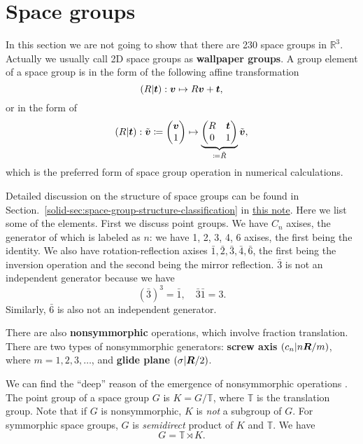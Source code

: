 \documentclass[hyperref, a4paper]{article}
\newcommand*{\concept}[1]{{\textbf{#1}}}
\newcommand{\soliddoc}{\href{../solid/solid.pdf}{this note}}
\begin{document}
\section{Space groups}

In this section we are not going to show that there are 230 space groups in $\mathbb{R}^3$. 
Actually we usually call 2D space groups as \concept{wallpaper groups}. A group element of a space group 
is in the form of the following affine transformation
\begin{equation}
    (R| \vb*{t}): \vb*{v} \mapsto R \vb*{v} + \vb*{t},
\end{equation}
or in the form of 
\begin{equation}
    (R | \vb*{t}) : \tilde{\vb*{v}} \coloneqq \pmqty{\vb*{v} \\ 1} \mapsto \underbrace{\pmqty{R & \vb*{t} \\ 0 & 1 }}_{\coloneqq \tilde{R}} \tilde{\vb*{v}},
\end{equation}
which is the preferred form of space group operation in numerical calculations.

Detailed discussion on the structure of space groups can be found in 
Section.~\ref{solid-sec:space-group-structure-classification} in \soliddoc.
Here we list some of the elements. First we discuss point groups. 
We have $C_n$ axises, the generator of which is labeled as $n$: 
we have 1, 2, 3, 4, 6 axises, the first being the identity. We also have rotation-reflection axises
$\bar{1}, \bar{2}, \bar{3}, \bar{4}, \bar{6}$, the first being the inversion operation and the second 
being the mirror reflection. $\bar{3}$ is not an independent generator because we have 
\[
    (\bar{3})^3 = \bar{1}, \quad \bar{3} \bar{1} = 3.
\]
Similarly, $\bar{6}$ is also not an independent generator.

There are also \concept{nonsymmorphic} operations, which involve fraction translation. There are two 
types of nonsymmorphic generators: \concept{screw axis} $(c_n | n \vb*{R} / m)$, where $m = 1, 2, 3, \ldots$,
and \concept{glide plane} $(\sigma | \vb*{R} / 2)$.

We can find the ``deep'' reason of the emergence of nonsymmorphic operations . 
The point group of a space group $G$ is $K = G / \mathbb{T}$, where $\mathbb{T}$ is the translation group.
Note that if $G$ is nonsymmorphic, $K$ is \emph{not} a subgroup of $G$. For symmorphic space groups, $G$ is \emph{semidirect}
product of $K$ and $\mathbb{T}$. We have 
\begin{equation}
    G = \mathbb{T} \rtimes K.
\end{equation}
\end{document}
